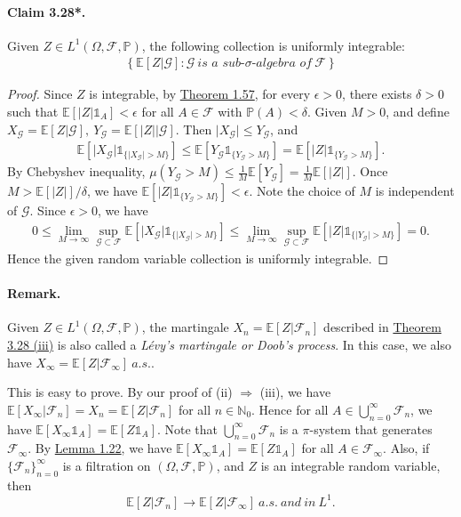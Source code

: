 \documentclass{article}
\numberwithin{equation}{section}
\newcommand{\E}{\mathbb{E}}
\renewcommand{\P}{\mathbb{P}}
\theoremstyle{plain}
\theoremstyle{definition}
\begin{document}
\paragraph{Claim 3.28*.\label{claim:3.28}} Given $Z\in L^1(\Omega,\mathscr{F},\P)$, the following collection is uniformly integrable:
\begin{align*}
	\left\{\E[Z|\mathscr{G}]:\mathscr{G}\ \textit{is a sub-$\sigma$-algebra of}\ \mathscr{F}\right\}
\end{align*}
\begin{proof}
Since $Z$ is integrable, by \hyperref[thm:1.57]{Theorem 1.57}, for every $\epsilon>0$, there exists $\delta>0$ such that $\E[\vert Z\vert\mathds{1}_A]<\epsilon$ for all $A\in\mathscr{F}$ with $\P(A)<\delta$. Given $M>0$, and define $X_\mathscr{G}=\E[Z|\mathscr{G}],\ Y_\mathscr{G}=\E[\vert Z\vert |\mathscr{G}]$. Then $\vert X_\mathscr{G}\vert\leq Y_\mathscr{G}$, and
\begin{align*}
	\E[\vert X_\mathscr{G}\vert\mathds{1}_{\{\vert X_\mathscr{G}\vert>M\}}]\leq\E[Y_\mathscr{G}\mathds{1}_{\{Y_\mathscr{G}>M\}}] = \E[\vert Z\vert\mathds{1}_{\{Y_\mathscr{G}>M\}}].
\end{align*}
By Chebyshev inequality, $\mu(Y_\mathscr{G}>M)\leq \frac{1}{M}\E[Y_\mathscr{G}]=\frac{1}{M}\E[\vert Z\vert]$. Once $M>\E[\vert Z\vert]/\delta$, we have $\E[\vert Z\vert\mathds{1}_{\{Y_\mathscr{G}>M\}}]<\epsilon$. Note the choice of $M$ is independent of $\mathscr{G}$. Since $\epsilon>0$, we have
\begin{align*}
	0\leq\lim_{M\to\infty}\sup_{\mathscr{G}\subset\mathscr{F}}\E\left[\vert X_\mathscr{G}\vert\mathds{1}_{\{\vert X_\mathscr{G}\vert>M\}}\right]\leq \lim_{M\to\infty}\sup_{\mathscr{G}\subset\mathscr{F}}\E\left[\vert Z\vert\mathds{1}_{\{\vert Y_\mathscr{G}\vert>M\}}\right] = 0.
\end{align*}
Hence the given random variable collection is uniformly integrable.
\end{proof}

\paragraph{Remark.} Given $Z\in L^1(\Omega,\mathscr{F},\P)$, the martingale $X_n=\E[Z|\mathscr{F}_n]$ described in \hyperref[thm:3.28]{Theorem 3.28 (iii)} is also called a \textit{Lévy's martingale or Doob's process}. In this case, we also have $X_\infty=\E[Z|\mathscr{F}_\infty]\ a.s..$

This is easy to prove. By our proof of (ii) $\Rightarrow$ (iii), we have $\E[X_\infty|\mathscr{F}_n]= X_n = \E[Z|\mathscr{F}_n]$ for all $n\in\mathbb{N}_0$. Hence for all $A\in\bigcup_{n=0}^\infty\mathscr{F}_n$, we have $\E[X_\infty\mathds{1}_A]=\E[Z\mathds{1}_A]$. Note that $\bigcup_{n=0}^\infty\mathscr{F}_n$ is a $\pi$-system that generates $\mathscr{F}_\infty$. By \hyperref[lemma:1.22]{Lemma 1.22}, we have $\E[X_\infty\mathds{1}_A]=\E[Z\mathds{1}_A]$ for all $A\in\mathscr{F}_\infty$. Also, if $\{\mathscr{F}_n\}_{n=0}^\infty$ is a filtration on $(\Omega,\mathscr{F},\P)$, and $Z$ is an integrable random variable, then $$\E[Z|\mathscr{F}_n]\to\E[Z|\mathscr{F}_\infty]\ a.s.\ and\ in\ L^1.$$
\end{document}

